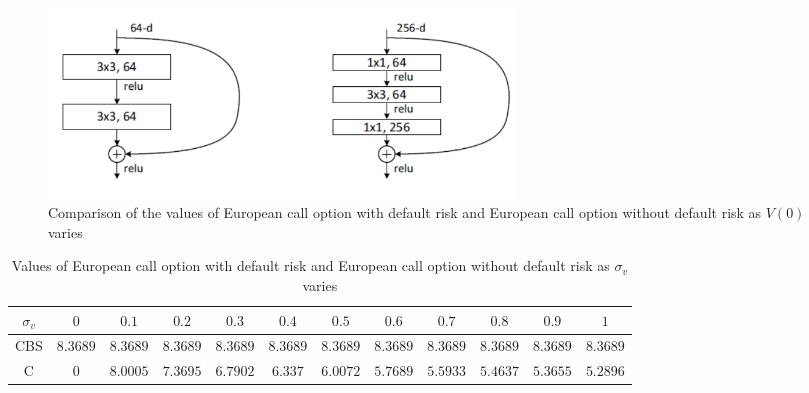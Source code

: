 \documentclass[pdf]{beamer}
\begin{document}
\begin{frame}[allowframebreaks]
\begin{figure}[hp]
	\includegraphics[width=0.60\textwidth]{png/bottleneck.png}
	\caption{Comparison of the values of European call option with default risk and European call option without default risk as $V(0)$ varies}
	\label{fig:ife2}
\end{figure}
\end{frame}
\begin{frame}[allowframebreaks]
\begin{table}
\small\addtolength{\tabcolsep}{-6pt}
\begin{tabular}{c|c|c|c|c|c|c|c|c|c|c|c}
$\sigma_{v}$ & $0$ & $0.1$ & $0.2$ & $0.3$ & $0.4$ & $0.5$ & $0.6$ & $0.7$ & $0.8$  & $0.9$ & $1$\\
\hline 
CBS & $8.3689$ & $8.3689$ & $8.3689$ & $8.3689$ & $8.3689$ & $8.3689$ & $8.3689$ & $8.3689$ & $8.3689$ & $8.3689$ & $8.3689$\\
\hline
C & $0$ & $8.0005$ & $7.3695$ & $6.7902$ & $6.337$ & $6.0072$ & $5.7689$ & $5.5933$ & $5.4637$ & $5.3655$ & $5.2896$\\
\end{tabular}
\caption{Values of European call option with default risk and European call option without default risk as $\sigma_{v}$ varies}
\end{table}
\end{frame}
\end{document}
